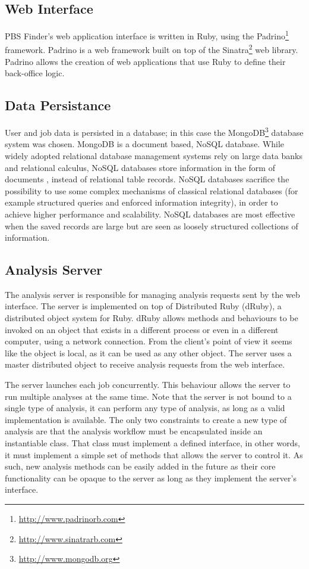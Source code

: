 \subsection{Web Interface}

PBS Finder's web application interface is written in Ruby, using the
Padrino\footnote{\url{http://www.padrinorb.com}} framework. Padrino is a web
framework built on top of the Sinatra\footnote{\url{http://www.sinatrarb.com}}
web library. Padrino allows the creation of web applications that use Ruby to
define their back-office logic.

\subsection{Data Persistance}

User and job data is persisted in a database; in this case the
MongoDB\footnote{\url{http://www.mongodb.org}} database system was chosen.
MongoDB is a document based, NoSQL database. While widely adopted relational
database management systems rely on large data banks and relational calculus,
NoSQL databases store information in the form of documents
\cite{strauch2011nosql}, instead of relational table records. NoSQL databases
sacrifice the possibility to use some complex mechanisms of classical relational
databases (for example structured queries and enforced information integrity),
in order to achieve higher performance and scalability. NoSQL databases are most
effective when the saved records are large but are seen as loosely structured
collections of information.

\subsection{Analysis Server}

The analysis server is responsible for managing analysis requests sent by the
web interface. The server is implemented on top of Distributed Ruby (dRuby), a
distributed object system for Ruby. dRuby allows methods and behaviours to be
invoked on an object that exists in a different process or even in a different
computer, using a network connection. From the client's point of view it seems
like the object is local, as it can be used as any other object. The server uses
a master distributed object to receive analysis requests from the web interface.

The server launches each job concurrently. This behaviour allows the server to
run multiple analyses at the same time. Note that the server is not bound to a
single type of analysis, it can perform any type of analysis, as long as a valid
implementation is available. The only two constraints to create a new type of
analysis are that the analysis workflow must be encapsulated inside an
instantiable class. That class must implement a defined interface, in other
words, it must implement a simple set of methods that allows the server to
control it. As such, new analysis methods can be easily added in the future as
their core functionality can be opaque to the server as long as they implement
the server's interface.


